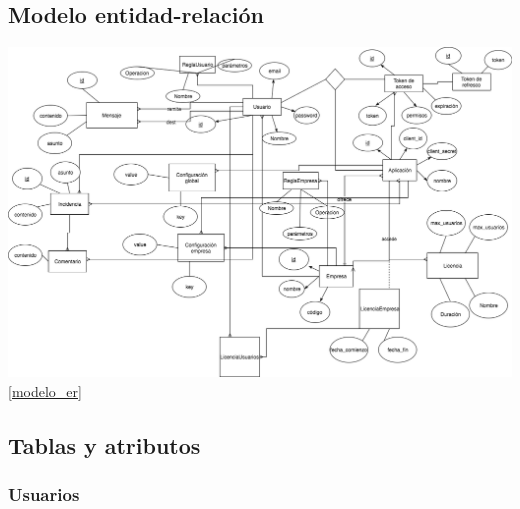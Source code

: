 \documentclass[12pt,a4paperpaper,]{report}
\begin{document}
\subsection{Modelo entidad-relación}\label{modelo-entidad-relaciuxf3n}

\includegraphics{source/figures/er-model-pfc.png} \ref{modelo_er}

\subsection{Tablas y atributos}\label{tablas-y-atributos}

\subsubsection{Usuarios}\label{usuarios-1}
\end{document}
